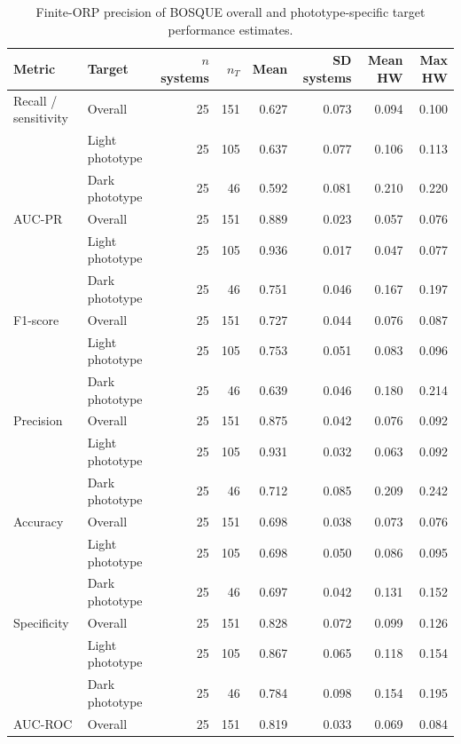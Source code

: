 \begin{table}[h!]
\centering
\scriptsize
\caption{Finite-ORP precision of BOSQUE overall and phototype-specific target performance estimates.}
\label{tab:target-pr-diagnostics}
\setlength{\tabcolsep}{3pt}
\renewcommand{\arraystretch}{1.08}
\begin{tabular}{llrrrrrr}
\toprule
\textbf{Metric} & \textbf{Target} & \textbf{$n$ systems} & \textbf{$n_T$} & \textbf{Mean} & \textbf{SD systems} & \textbf{Mean HW} & \textbf{Max HW} \\
\midrule
Recall / sensitivity & Overall & 25 & 151 & 0.627 & 0.073 & 0.094 & 0.100 \\
 & Light phototype & 25 & 105 & 0.637 & 0.077 & 0.106 & 0.113 \\
 & Dark phototype & 25 & 46 & 0.592 & 0.081 & 0.210 & 0.220 \\
\addlinespace
AUC-PR & Overall & 25 & 151 & 0.889 & 0.023 & 0.057 & 0.076 \\
 & Light phototype & 25 & 105 & 0.936 & 0.017 & 0.047 & 0.077 \\
 & Dark phototype & 25 & 46 & 0.751 & 0.046 & 0.167 & 0.197 \\
\addlinespace
F1-score & Overall & 25 & 151 & 0.727 & 0.044 & 0.076 & 0.087 \\
 & Light phototype & 25 & 105 & 0.753 & 0.051 & 0.083 & 0.096 \\
 & Dark phototype & 25 & 46 & 0.639 & 0.046 & 0.180 & 0.214 \\
\addlinespace
Precision & Overall & 25 & 151 & 0.875 & 0.042 & 0.076 & 0.092 \\
 & Light phototype & 25 & 105 & 0.931 & 0.032 & 0.063 & 0.092 \\
 & Dark phototype & 25 & 46 & 0.712 & 0.085 & 0.209 & 0.242 \\
\addlinespace
Accuracy & Overall & 25 & 151 & 0.698 & 0.038 & 0.073 & 0.076 \\
 & Light phototype & 25 & 105 & 0.698 & 0.050 & 0.086 & 0.095 \\
 & Dark phototype & 25 & 46 & 0.697 & 0.042 & 0.131 & 0.152 \\
\addlinespace
Specificity & Overall & 25 & 151 & 0.828 & 0.072 & 0.099 & 0.126 \\
 & Light phototype & 25 & 105 & 0.867 & 0.065 & 0.118 & 0.154 \\
 & Dark phototype & 25 & 46 & 0.784 & 0.098 & 0.154 & 0.195 \\
\addlinespace
AUC-ROC & Overall & 25 & 151 & 0.819 & 0.033 & 0.069 & 0.084 \\

\end{tabular}
\end{table}

